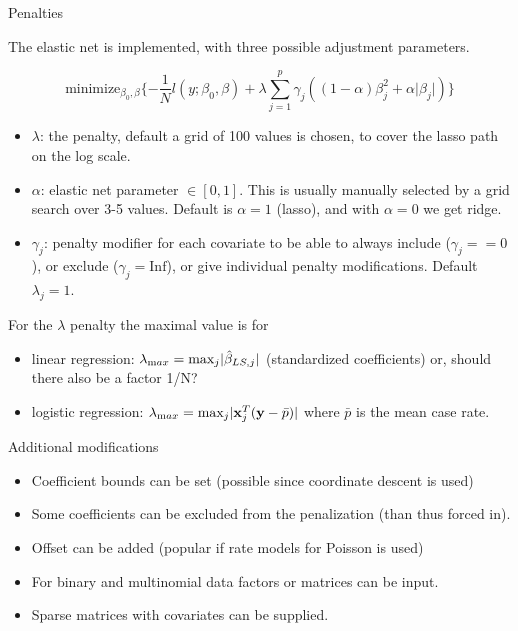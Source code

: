 \documentclass[
  ignorenonframetext,
]{beamer}
\providecommand{\tightlist}{%
  \setlength{\itemsep}{0pt}\setlength{\parskip}{0pt}}
\begin{document}
\begin{frame}

\begin{block}{Penalties}

The elastic net is implemented, with three possible adjustment
parameters.

\[ \text{minimize}_{\beta_0,\beta} \{ -\frac{1}{N} l(y;\beta_0,\beta)+\lambda \sum_{j=1}^p
\gamma_j ((1-\alpha)\beta_j^2+\alpha \lvert \beta_j \rvert)\}\]

\begin{itemize}
\tightlist
\item
  \(\lambda\): the penalty, default a grid of 100 values is chosen, to
  cover the lasso path on the log scale.
\item
  \(\alpha\): elastic net parameter \(\in [0,1]\). This is usually
  manually selected by a grid search over 3-5 values. Default is
  \(\alpha=1\) (lasso), and with \(\alpha=0\) we get ridge.
\item
  \(\gamma_j\): penalty modifier for each covariate to be able to always
  include (\(\gamma_j==0\)), or exclude (\(\gamma_j=\text{Inf}\)), or
  give individual penalty modifications. Default \(\lambda_j=1\).
\end{itemize}

\end{block}

\end{frame}

\begin{frame}

For the \(\lambda\) penalty the maximal value is for

\begin{itemize}
\tightlist
\item
  linear regression:
  \(\lambda_{\text max}=\text{max}_j \lvert \hat{\beta}_{LS,j} \rvert\)
  (standardized coefficients) or, should there also be a factor 1/N?
\item
  logistic regression:
  \(\lambda_{\text max}=\text{max}_{j}\lvert {\bf x}_j ^T ({\bf y}-\bar{p}) \rvert\)
  where \(\bar p\) is the mean case rate.
\end{itemize}

\begin{block}{Additional modifications}

\begin{itemize}
\tightlist
\item
  Coefficient bounds can be set (possible since coordinate descent is
  used)
\item
  Some coefficients can be excluded from the penalization (than thus
  forced in).
\item
  Offset can be added (popular if rate models for Poisson is used)
\item
  For binary and multinomial data factors or matrices can be input.
\item
  Sparse matrices with covariates can be supplied.
\end{itemize}

\end{block}

\end{frame}
\end{document}
